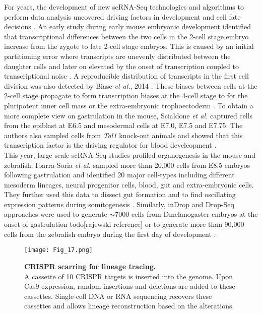 For years, the development of new scRNA-Seq technologies and algorithms to perform data analysis uncovered driving factors in development and cell fate decisions \citep{Griffiths2018}. An early study during early mouse embryonic development identified that transcriptional differences between the two cells in the 2-cell stage embryo increase from the zygote to late 2-cell stage embryos. This is caused by an initial partitioning error where transcripts are unevenly distributed between the daughter cells and later on elevated by the onset of transcription coupled to transcriptional noise \citep{Piras2014, Shi2015a}. A reproducible distribution of transcripts in the first cell division was also detected by Biase \emph{et al.}, 2014 \cite{Biase2014}. These biases between cells at the 2-cell stage propagate to form transcription biases at the 4-cell stage to for the pluripotent inner cell mass or the extra-embryonic trophoectoderm \citep{Goolam2016, Shi2015a}. To obtain a more complete view on gastrulation in the mouse, Scialdone \emph{et al.} captured cells from the epiblast at E6.5 and mesodermal cells at E7.0, E7.5 and E7.75. The authors also sampled cells from \emph{Tal1} knock-out animals and showed that this transcription factor is the driving regulator for blood develeopment \citep{Scialdone2016}. \\

This year, large-scale scRNA-Seq studies profiled organogenesis in the mouse and zebrafish. Ibarra-Soria \emph{et al.} sampled more than 20,000 cells from E8.5 embryos following gastrulation and identified 20 major cell-types including different mesoderm lineages, neural progenitor cells, blood, gut and extra-embryonic cells. They further used this data to dissect gut formation and to find oscillating expression patterns during somitogenesis \citep{Ibarra-Soria2018}. Similarly, inDrop and Drop-Seq approaches were used to generate $\sim$7000 cells from \gls{Dmelanogaster} embryos at the onset of gastrulation todo{[rajewski reference]} or to generate more than 90,000 cells from the zebrafish embryo during the first day of development \citep{Wagner2018}.

\begin{figure}[!h]
\centering
\texttt{[image: Fig\_17.png]}
\caption[CRISPR scarring for lineage tracing]{\textbf{CRISPR scarring for lineage tracing.}\\
A cassette of 10 CRISPR targets is inserted into the genome. Upon Cas9 expression, random insertions and deletions are added to these cassettes. Single-cell DNA or RNA sequencing recovers these cassettes and allows lineage reconstruction based on the alterations.}
\label{fig0:CRISPR}
\end{figure}

